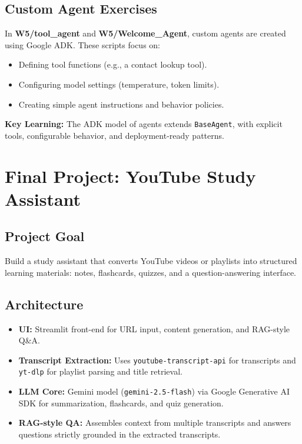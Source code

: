 \documentclass[11pt]{article}
\begin{document}
\subsection{Custom Agent Exercises}
In \textbf{W5/tool\_agent} and \textbf{W5/Welcome\_Agent}, custom agents are created using Google ADK. These scripts focus on:
\begin{itemize}[leftmargin=2em]
    \item Defining tool functions (e.g., a contact lookup tool).
    \item Configuring model settings (temperature, token limits).
    \item Creating simple agent instructions and behavior policies.
\end{itemize}

\textbf{Key Learning:} The ADK model of agents extends \texttt{BaseAgent}, with explicit tools, configurable behavior, and deployment-ready patterns.

\section{Final Project: YouTube Study Assistant}
\subsection{Project Goal}
Build a study assistant that converts YouTube videos or playlists into structured learning materials: notes, flashcards, quizzes, and a question-answering interface.

\subsection{Architecture}
\begin{itemize}[leftmargin=2em]
    \item \textbf{UI:} Streamlit front-end for URL input, content generation, and RAG-style Q\&A.
    \item \textbf{Transcript Extraction:} Uses \texttt{youtube-transcript-api} for transcripts and \texttt{yt-dlp} for playlist parsing and title retrieval.
    \item \textbf{LLM Core:} Gemini model (\texttt{gemini-2.5-flash}) via Google Generative AI SDK for summarization, flashcards, and quiz generation.
    \item \textbf{RAG-style QA:} Assembles context from multiple transcripts and answers questions strictly grounded in the extracted transcripts.
\end{itemize}
\end{document}
